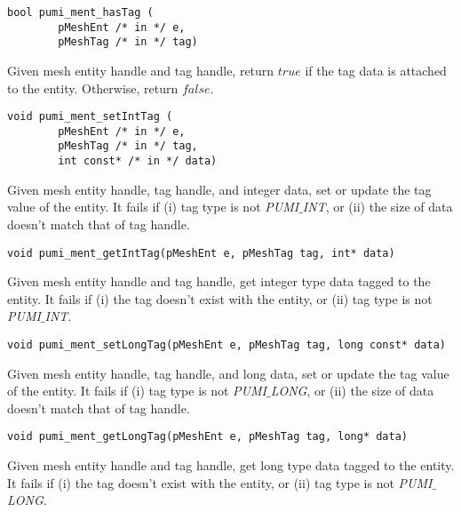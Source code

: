 \begin{verbatim}
bool pumi_ment_hasTag (
        pMeshEnt /* in */ e, 
        pMeshTag /* in */ tag)
\end{verbatim}\vspace{-.5cm}\hspace{1cm}
        Given mesh entity handle and tag handle, return $true$ if the tag data is attached to the entity. Otherwise, return $false$.

\begin{verbatim}
void pumi_ment_setIntTag (
        pMeshEnt /* in */ e, 
        pMeshTag /* in */ tag,
        int const* /* in */ data)
\end{verbatim}\vspace{-.5cm}\hspace{1cm}
Given mesh entity handle, tag handle, and integer data, set or update the tag value of the entity. It fails if (i) tag type is not \emph{PUMI}$\_$\emph{INT}, or (ii) the size of data doesn't match that of tag handle.

\begin{verbatim}
void pumi_ment_getIntTag(pMeshEnt e, pMeshTag tag, int* data)
\end{verbatim}\vspace{-.5cm}\hspace{1cm}
Given mesh entity handle and tag handle, get integer type data tagged to the entity. It fails if (i) the tag doesn't exist with the entity, or (ii) tag type is not \emph{PUMI}$\_$\emph{INT}.


\begin{verbatim}
void pumi_ment_setLongTag(pMeshEnt e, pMeshTag tag, long const* data)
\end{verbatim}\vspace{-.5cm}\hspace{1cm}
Given mesh entity handle, tag handle, and long data, set or update the tag value of the entity. It fails if (i) tag type is not \emph{PUMI}$\_$\emph{LONG}, or (ii) the size of data doesn't match that of tag handle.


\begin{verbatim}
void pumi_ment_getLongTag(pMeshEnt e, pMeshTag tag, long* data)
\end{verbatim}\vspace{-.5cm}\hspace{1cm}
Given mesh entity handle and tag handle, get long type data tagged to the entity. It fails if (i) the tag doesn't exist with the entity, or (ii) tag type is not \emph{PUMI}$\_$\emph{LONG}.


